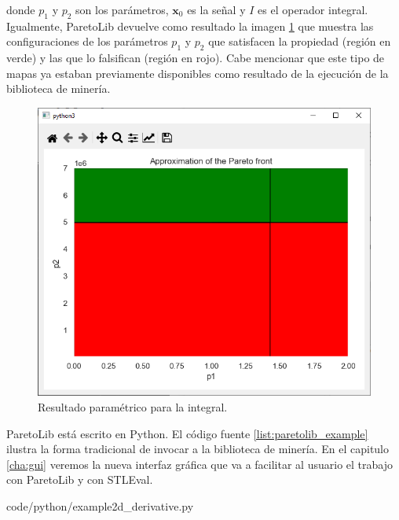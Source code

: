 donde $p_1$ y $p_2$ son los parámetros, $\mathbf{x}_0$ es la señal y $I$ es el operador integral.
Igualmente, ParetoLib devuelve como resultado la imagen \ref{fig:param_integral} que muestra las configuraciones de los parámetros $p_1$ y $p_2$ que satisfacen la propiedad (región en verde) y las que lo falsifican (región en rojo). 
Cabe mencionar que este tipo de mapas ya estaban previamente disponibles como resultado de la ejecución de la biblioteca de minería.

\begin{figure}[htb]
\centering
  \includegraphics[width=0.7\linewidth]{images/stl_parametrico_int} 
\caption{Resultado paramétrico para la integral.}
\label{fig:param_integral}
\end{figure}

ParetoLib está escrito en Python. El código fuente \ref{list:paretolib_example} ilustra la forma tradicional de invocar a la biblioteca de minería. En el capitulo \ref{cha:gui} veremos la nueva interfaz gráfica que va a facilitar al usuario el trabajo con ParetoLib y con STLEval.



		{code/python/example2d_derivative.py}

